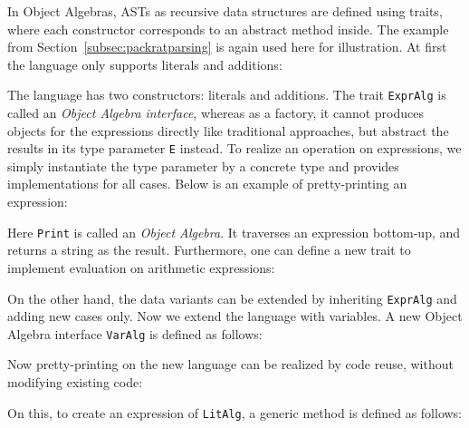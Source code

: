In Object Algebras, ASTs as recursive data structures are defined using traits, where each constructor corresponds
to an abstract method inside. The example from Section~\ref{subsec:packratparsing} is again used here for illustration.
At first the language only supports literals and additions:


The language has two constructors: literals and additions. The trait \lstinline{ExprAlg} is called an \textit{Object Algebra interface},
whereas as a factory, it cannot produces objects for the expressions directly like traditional approaches, but abstract the results in its
type parameter \lstinline{E} instead. To realize an operation on expressions, we simply instantiate the type parameter by a concrete type and
provides implementations for all cases. Below is an example of pretty-printing an expression:


Here \lstinline{Print} is called an \textit{Object Algebra}. It traverses an expression bottom-up, and returns a string as the result.
Furthermore, one can define a new trait to implement evaluation on arithmetic expressions:


On the other hand, the data variants can be extended by inheriting \lstinline{ExprAlg} and adding new cases only. Now we extend the language
with variables. A new Object Algebra interface \lstinline{VarAlg} is defined as follows:


Now pretty-printing on the new language can be realized by code reuse, without modifying existing code:


On this, to create an expression of \lstinline{LitAlg}, a generic method is defined as follows:


